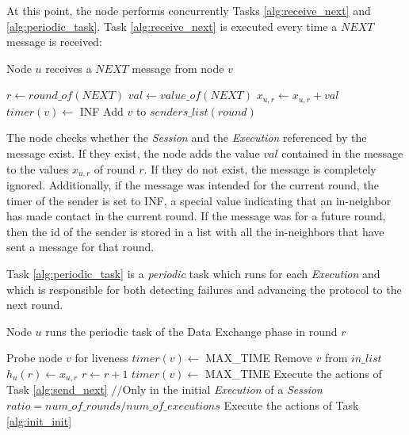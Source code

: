 \documentclass[a4paper,11pt,twoside]{report}
\begin{document}
At this point, the node performs concurrently Tasks \ref{alg:receive_next} and \ref{alg:periodic_task}. Task \ref{alg:receive_next} is executed every time a $NEXT$ message is received:

\begin{algorithm}
 		\caption{Node $u$ receives a $NEXT$ message from node $v$}
 		\label{alg:receive_next}
 		\begin{algorithmic}[1]
		 \STATE $r \leftarrow round\_of(NEXT)$
		 \STATE $val \leftarrow value\_of(NEXT)$
		 \STATE $x_{u,r} \leftarrow x_{u,r} + val$
		 \STATE $timer(v) \leftarrow$ INF
		 \ELSE
		 \STATE Add $v$ to $senders\_list(round)$
		 \ENDIF
		 \ENDIF
 		\end{algorithmic}
\end{algorithm}

The node checks whether the \textit{Session} and the \textit{Execution} referenced by the message exist. If they exist, the node adds the value $val$ contained in the message to the values $x_{u,r}$ of round $r$. If they do not exist, the message is completely ignored. Additionally, if the message was intended for the current round, the timer of the sender is set to INF, a special value indicating that an in-neighbor has made contact in the current round. If the message was for a future round, then the id of the sender is stored in a list with all the in-neighbors that have sent a message for that round. \\



Task \ref{alg:periodic_task} is a \textit{periodic} task which runs for each \textit{Execution} and which is responsible for both detecting failures and advancing the protocol to the next round.

\begin{algorithm}
 		\caption{Node $u$ runs the periodic task of the Data Exchange phase in round $r$}
 		\label{alg:periodic_task}
 		\begin{algorithmic}[1]
		 \STATE Probe node $v$ for liveness
		 \STATE $timer(v) \leftarrow$ MAX\_TIME
		 \ELSE
		 \STATE Remove $v$ from $in\_list$
		 \ENDIF
		 \ENDIF
		 \ENDFOR
		 \STATE $h_u(r) \leftarrow x_{u,r}$
		 \STATE $r \leftarrow r+1$
		 		 \STATE $timer(v) \leftarrow$ MAX\_TIME
		 		 \ENDFOR
		 \STATE Execute the actions of Task \ref{alg:send_next}
		 \STATE $//$Only in the initial \textit{Execution} of a \textit{Session}
		 \STATE $ratio=num\_of\_rounds/num\_of\_executions$
		 \STATE Execute the actions of Task \ref{alg:init_init}
		 \ENDIF
		 \ENDIF
 		\end{algorithmic}
\end{algorithm}
\end{document}
